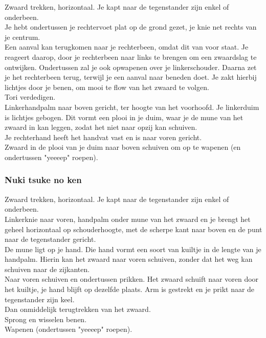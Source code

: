 \suwaristart
Zwaard trekken, horizontaal. Je kapt naar de tegenstander zijn enkel of onderbeen.\\
Je hebt ondertussen je rechtervoet plat op de grond gezet, je knie net rechts van je centrum.\\
Een aanval kan terugkomen naar je rechterbeen, omdat dit van voor staat. Je reageert daarop, door je rechterbeen naar links te brengen om een zwaardslag te ontwijken. Ondertussen zal je ook opwapenen over je linkerschouder. Daarna zet je het rechterbeen terug, terwijl je een aanval naar beneden doet. Je zakt hierbij lichtjes door je benen, om mooi te flow van het zwaard te volgen.\\
Tori verdedigen.\\
Linkerhandpalm naar boven gericht, ter hoogte van het voorhoofd. Je linkerduim is lichtjes gebogen. Dit vormt een plooi in je duim, waar je de mune van het zwaard in kan leggen, zodat het niet naar opzij kan schuiven.\\
Je rechterhand heeft het handvat vast en is naar voren gericht.\\
Zwaard in de plooi van je duim naar boven schuiven om op te wapenen (en ondertussen "yeeeep" roepen).\\
\suwaristop

\subsubsection{Nuki tsuke no ken}

\suwaristart
Zwaard trekken, horizontaal. Je kapt naar de tegenstander zijn enkel of onderbeen.\\
Linkerknie naar voren, handpalm onder mune van het zwaard en je brengt het geheel horizontaal op schouderhoogte, met de scherpe kant naar boven en de punt naar de tegenstander gericht.\\
De mune ligt op je hand. Die hand vormt een soort van kuiltje in de lengte van je handpalm. Hierin kan het zwaard naar voren schuiven, zonder dat het weg kan schuiven naar de zijkanten.\\
Naar voren schuiven en ondertussen prikken. Het zwaard schuift naar voren door het kuiltje, je hand blijft op dezelfde plaats. Arm is gestrekt en je prikt naar de tegenstander zijn keel.\\
Dan onmiddelijk terugtrekken van het zwaard.\\
Sprong en wisselen benen.\\
Wapenen (ondertussen "yeeeep" roepen).\\
\suwaristop

